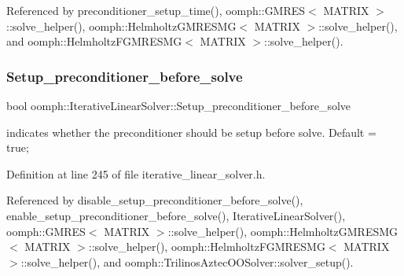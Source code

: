 Referenced by preconditioner\+\_\+setup\+\_\+time(), oomph\+::\+G\+M\+R\+E\+S$<$ M\+A\+T\+R\+I\+X $>$\+::solve\+\_\+helper(), oomph\+::\+Helmholtz\+G\+M\+R\+E\+S\+M\+G$<$ M\+A\+T\+R\+I\+X $>$\+::solve\+\_\+helper(), and oomph\+::\+Helmholtz\+F\+G\+M\+R\+E\+S\+M\+G$<$ M\+A\+T\+R\+I\+X $>$\+::solve\+\_\+helper().

\mbox{\label{classoomph_1_1IterativeLinearSolver_af0344cc8a3a850f160973f1d44bf20f2}} 
\subsubsection{\texorpdfstring{Setup\+\_\+preconditioner\+\_\+before\+\_\+solve}{Setup\_preconditioner\_before\_solve}}
{\footnotesize\ttfamily bool oomph\+::\+Iterative\+Linear\+Solver\+::\+Setup\+\_\+preconditioner\+\_\+before\+\_\+solve\hspace{0.3cm}{\ttfamily [protected]}}



indicates whether the preconditioner should be setup before solve. Default = true; 



Definition at line 245 of file iterative\+\_\+linear\+\_\+solver.\+h.



Referenced by disable\+\_\+setup\+\_\+preconditioner\+\_\+before\+\_\+solve(), enable\+\_\+setup\+\_\+preconditioner\+\_\+before\+\_\+solve(), Iterative\+Linear\+Solver(), oomph\+::\+G\+M\+R\+E\+S$<$ M\+A\+T\+R\+I\+X $>$\+::solve\+\_\+helper(), oomph\+::\+Helmholtz\+G\+M\+R\+E\+S\+M\+G$<$ M\+A\+T\+R\+I\+X $>$\+::solve\+\_\+helper(), oomph\+::\+Helmholtz\+F\+G\+M\+R\+E\+S\+M\+G$<$ M\+A\+T\+R\+I\+X $>$\+::solve\+\_\+helper(), and oomph\+::\+Trilinos\+Aztec\+O\+O\+Solver\+::solver\+\_\+setup().

\mbox{\label{classoomph_1_1IterativeLinearSolver_ab90d7e7780e709946dd0540a146186b5}} 
